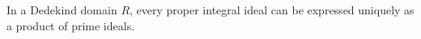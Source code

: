In a Dedekind domain $R$, every proper integral ideal can be expressed uniquely as a product of prime ideals.
